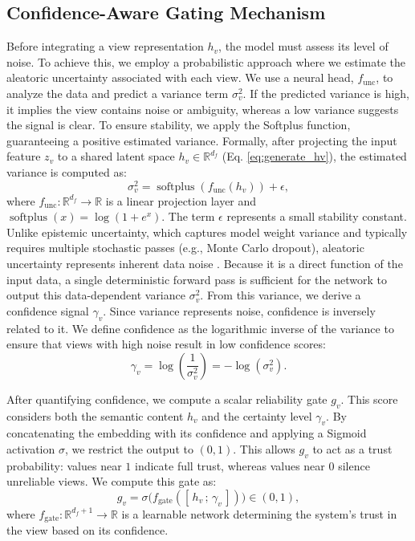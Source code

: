 \documentclass[journal]{IEEEtran}
\begin{document}
\subsection{Confidence-Aware Gating Mechanism}

Before integrating a view representation $h_v$, the model must assess its level of noise. To achieve this, we employ a probabilistic approach where we estimate the aleatoric uncertainty associated with each view. We use a neural head, $f_{\text{unc}}$, to analyze the data and predict a variance term $\sigma_v^2$. If the predicted variance is high, it implies the view contains noise or ambiguity, whereas a low variance suggests the signal is clear. To ensure stability, we apply the Softplus function, guaranteeing a positive estimated variance. Formally, after projecting the input feature $z_v$ to a shared latent space $h_v \in \mathbb{R}^{d_f}$ (Eq. \ref{eq:generate_hv}), the estimated variance is computed as:
\begin{equation}
\sigma_v^2 = \operatorname{softplus}(f_{\text{unc}}(h_v)) + \epsilon,
\end{equation}
where $f_{\text{unc}}: \mathbb{R}^{d_f} \to \mathbb{R}$ is a linear projection layer and $\operatorname{softplus}(x) = \log(1 + e^x)$. The term $\epsilon$ represents a small stability constant. Unlike epistemic uncertainty, which captures model weight variance and typically requires multiple stochastic passes (e.g., Monte Carlo dropout), aleatoric uncertainty represents inherent data noise \cite{kendall2017uncertainties}. Because it is a direct function of the input data, a single deterministic forward pass is sufficient for the network to output this data-dependent variance $\sigma_v^2$. From this variance, we derive a confidence signal $\gamma_v$. Since variance represents noise, confidence is inversely related to it. We define confidence as the logarithmic inverse of the variance to ensure that views with high noise result in low confidence scores:
\begin{equation}
\gamma_v = \log\left(\frac{1}{\sigma_v^2}\right) = -\log(\sigma_v^2).
\end{equation}

After quantifying confidence, we compute a scalar reliability gate $g_v$. This score considers both the semantic content $h_v$ and the certainty level $\gamma_v$. By concatenating the embedding with its confidence and applying a Sigmoid activation $\sigma$, we restrict the output to $(0, 1)$. This allows $g_v$ to act as a trust probability: values near $1$ indicate full trust, whereas values near $0$ silence unreliable views. We compute this gate as:
\begin{equation} \label{eq:gate}
g_v = \sigma\!\bigl(f_{\text{gate}}([\,h_v\,;\,\gamma_v\,])\bigr) \in (0,1),
\end{equation}
where $f_{\text{gate}}: \mathbb{R}^{d_f+1} \to \mathbb{R}$ is a learnable network determining the system's trust in the view based on its confidence.
\end{document}
